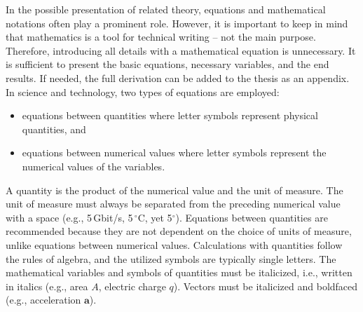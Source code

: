 In the possible presentation of related theory, equations and
mathematical notations often play a prominent role. However, it is
important to keep in mind that mathematics is a tool for technical
writing – not the main purpose. Therefore, introducing all details
with a mathematical equation is unnecessary. It is sufficient to
present the basic equations, necessary variables, and the end
results. If needed, the full derivation can be added to the thesis as
an appendix. In science and technology, two types of equations are
employed:

\begin{itemize}
\item{equations between quantities where letter symbols represent physical quantities, and}
\item{equations between numerical values where letter symbols represent the numerical values of the variables.}
\end{itemize}

A quantity is the product of the numerical value and the unit of
measure. The unit of measure must always be separated from the
preceding numerical value with a space (e.g., 5\,Gbit/s, 5\,$^\circ$C, yet 5$^\circ$). Equations between quantities are recommended because they are not dependent on the choice of units of measure, unlike equations between numerical values. Calculations with quantities follow the rules of algebra, and the utilized symbols are typically single letters. The mathematical variables and symbols of quantities must be italicized, i.e., written in italics (e.g., area $A$, electric charge $q$). Vectors must be italicized and boldfaced (e.g., acceleration $\mathbf{a}$).

